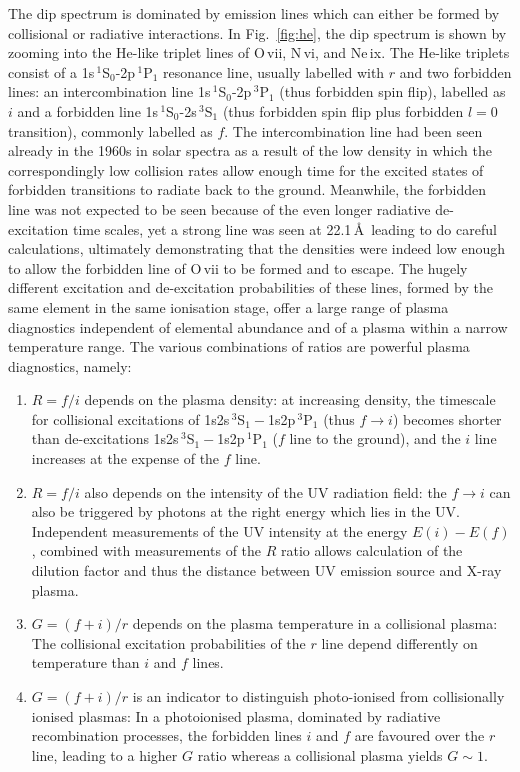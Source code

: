 \documentclass{aa}
\begin{document}
\noindent
The dip spectrum is dominated by emission lines which can either be formed
by collisional or radiative interactions. In Fig.~\ref{fig:he}, the
dip spectrum is shown by zooming into the He-like triplet lines of
O\,{\sc vii}, N\,{\sc vi}, and Ne\,{\sc ix}. The He-like triplets consist
of a 1s\,$^1$S$_0$-2p\,$^1$P$_1$ resonance line, usually labelled with
$r$ and two forbidden lines: an
intercombination line 1s\,$^1$S$_0$-2p\,$^3$P$_1$ (thus forbidden spin
flip), labelled as $i$ and a forbidden line
1s\,$^1$S$_0$-2s\,$^3$S$_1$ (thus forbidden spin flip plus forbidden
$l=0$ transition), commonly labelled as $f$. The intercombination
line had been seen already in the 1960s in solar spectra as a result of the low
density in which the correspondingly low collision rates allow enough
time for the excited states of forbidden transitions to radiate back to
the ground. Meanwhile,
the forbidden line was not expected to be seen because of the even
longer radiative de-excitation time scales, yet a strong line was seen
at 22.1\,\AA\ leading \cite{gj69} to do careful calculations, ultimately
demonstrating that the densities were indeed low enough to allow the
forbidden line of O\,{\sc vii} to be formed and to escape.
The hugely different excitation and de-excitation probabilities of these
lines, formed by the same element in the same ionisation stage, offer a
large range of plasma diagnostics independent of elemental abundance
and of a plasma within a narrow temperature range. The various
combinations of ratios are powerful plasma diagnostics, namely:
\begin{enumerate}
   \setlength{\itemsep}{0pt}%
   \setlength{\parskip}{0pt}%
\item $R=f/i$ depends on the plasma density: at increasing density,
   the timescale for collisional excitations of 1s2s\,$^3$S$_1-$1s2p\,$^3$P$_1$ 
   (thus $f\rightarrow i$) becomes shorter than de-excitations
   1s2s\,$^3$S$_1-$1s2p\,$^1$P$_1$ ($f$ line to the ground),
   and the $i$ line increases at the expense of the $f$ line.
\item $R=f/i$ also depends on the intensity of the UV radiation field: the
    $f\rightarrow i$ can also be triggered by photons at the right
    energy which lies in the UV. Independent measurements of the
    UV intensity at the energy $E(i)-E(f)$, combined with measurements
    of the $R$ ratio allows calculation of the dilution factor and thus
    the distance between UV emission source and X-ray plasma.
\item $G=(f+i)/r$ depends on the plasma temperature in a collisional
    plasma: The collisional excitation probabilities of the $r$ line
    depend differently on temperature than $i$ and $f$ lines.
\item $G=(f+i)/r$ is an indicator to distinguish photo-ionised from
    collisionally ionised plasmas: In a photoionised plasma, dominated
    by radiative recombination processes, the forbidden lines $i$ and
    $f$ are favoured over the $r$ line, leading to a higher $G$ ratio
    whereas a collisional plasma yields $G\sim 1$.
\end{enumerate}
\end{document}
